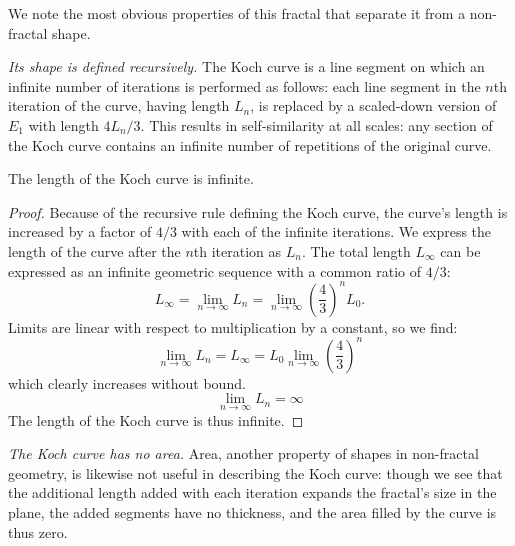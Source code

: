 We note the most obvious properties of this fractal that separate it from a non-fractal shape. 

\begin{myobs}\textit{Its shape is defined recursively.} The Koch curve is a line segment on which an infinite number of iterations is performed as follows: each line segment in the $n$th iteration of the curve, having length $L_n$, is replaced by a scaled-down version of $E_1$ with length $4L_n/3$. This results in self-similarity at all scales: any section of the Koch curve contains an infinite number of repetitions of the original curve.\end{myobs}

\begin{myobs}The length of the Koch curve is infinite.\end{myobs}

\begin{proof}
Because of the recursive rule defining the Koch curve, the curve's length is increased by a factor of $ 4/3 $ with each of the infinite iterations. We express the length of the curve after the $n$th iteration as $L_n$. The total length $L_\infty$ can be expressed as an infinite geometric sequence with a common ratio of $ 4/3 $:
\begin{equation}
	L_\infty = \lim_{n \to \infty}L_n = \lim_{n \to \infty}\left(\frac{4}{3}\right)^n L_0.
\end{equation}
Limits are linear with respect to multiplication by a constant, so we find:
\begin{equation}
	\lim_{n \to \infty}L_n = L_\infty = L_0 \lim_{n \to \infty} \left(\frac{4}{3}\right)^n
\end{equation}
which clearly increases without bound.
\begin{equation}
	\lim_{n \to \infty}L_n = \infty 
\end{equation}
The length of the Koch curve is thus infinite.
\end{proof}

\begin{myobs}\textit{The Koch curve has no area.} Area, another property of shapes in non-fractal geometry, is likewise not useful in describing the Koch curve: though we see that the additional length added with each iteration expands the fractal's size in the plane, the added segments have no thickness, and the area filled by the curve is thus zero.\end{myobs} 


